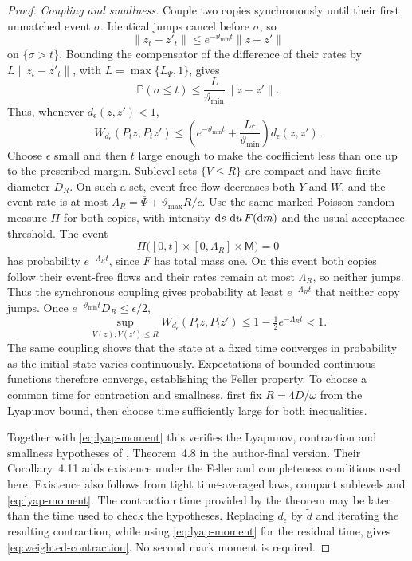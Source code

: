\begin{proof}
\emph{Coupling and smallness.} Couple two copies synchronously until their first unmatched event \(\sigma\). Identical jumps cancel before \(\sigma\), so
\[
\|z_t-z'_t\|\leq e^{-\vartheta_{\min}t}\|z-z'\|
\]
on \(\{\sigma>t\}\). Bounding the compensator of the difference of their rates by \(L\|z_t-z'_t\|\), with \(L=\max\{L_\Psi,1\}\), gives
\[
\mathbb P(\sigma\leq t)\leq
\frac{L}{\vartheta_{\min}}\|z-z'\|.
\]
Thus, whenever \(d_\epsilon(z,z')<1\),
\begin{equation}\label{eq:coupling-contraction}
W_{d_\epsilon}(P_tz,P_tz')
\leq\left(e^{-\vartheta_{\min}t}
+\frac{L\epsilon}{\vartheta_{\min}}\right)d_\epsilon(z,z').
\end{equation}
Choose \(\epsilon\) small and then \(t\) large enough to make the coefficient less than one up to the prescribed margin. Sublevel sets \(\{V\leq R\}\) are compact and have finite diameter \(D_R\). On such a set, event-free flow decreases both \(Y\) and \(W\), and the event rate is at most \(\Lambda_R=\bar\Psi+\vartheta_{\max}R/c\). 
Use the same marked Poisson random measure $\Pi$ for both
copies, with intensity $\mathop{}\!\mathrm{d} s\,\mathop{}\!\mathrm{d} u\,F(\mathop{}\!\mathrm{d} m)$ and the
usual acceptance threshold. The event
\[
 \Pi\bigl([0,t]\times[0,\Lambda_R]\times\mathsf M\bigr)=0
\]
has probability $e^{-\Lambda_Rt}$, since $F$ has total mass one. On this
event both copies follow their event-free flows and their rates remain at
most $\Lambda_R$, so neither jumps. Thus the synchronous coupling gives probability at least $e^{-\Lambda_Rt}$ that neither copy jumps. Once \(e^{-\vartheta_{\min}t}D_R\leq\epsilon/2\),
\[
\sup_{V(z),V(z')\leq R}W_{d_\epsilon}(P_tz,P_tz')
\leq1-\tfrac12e^{-\Lambda_Rt}<1.
\]
The same coupling shows that the state at a fixed time converges in probability as the initial state varies continuously. Expectations of bounded continuous functions therefore converge, establishing the Feller property. To choose a common time for contraction and smallness, first fix \(R=4D/\omega\) from the Lyapunov bound, then choose time sufficiently large for both inequalities.

Together with \eqref{eq:lyap-moment} this verifies the Lyapunov, contraction and smallness hypotheses of \citet{HairerMattinglyScheutzow2011}, Theorem~4.8 in the author-final version. Their Corollary~4.11 adds existence under the Feller and completeness conditions used here. Existence also follows from tight time-averaged laws, compact sublevels and \eqref{eq:lyap-moment}. The contraction time provided by the theorem may be later than the time used to check the hypotheses. Replacing \(d_\epsilon\) by \(\widetilde d\) and iterating the resulting contraction, while using \eqref{eq:lyap-moment} for the residual time, gives \eqref{eq:weighted-contraction}. No second mark moment is required.


\end{proof}
